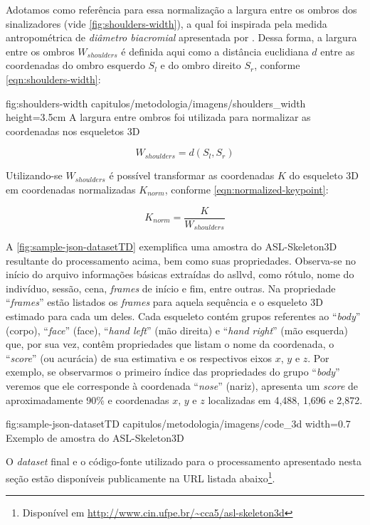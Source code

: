 \begin{enumerate}
          Adotamos como referência para essa normalização a largura entre os ombros dos sinalizadores (vide \autoref{fig:shoulders-width}), a qual foi inspirada pela medida antropométrica de \textit{diâmetro biacromial} apresentada por . Dessa forma, a largura entre os ombros \(W_{shoulders}\) é definida aqui como a distância euclidiana \(d\) entre as coordenadas do ombro esquerdo \(S_{l}\) e do ombro direito \(S_ {r}\), conforme \autoref{eqn:shoulders-width}:

          \figura
          {fig:shoulders-width} %
          {capitulos/metodologia/imagens/shoulders_width} %
          {height=3.5cm} %
          {A largura entre ombros foi utilizada para normalizar as coordenadas nos esqueletos 3D} %
          {} %

          \begin{equation}
              \label{eqn:shoulders-width}
              W_{shoulders} = d\left(S_{l}, S_{r}\right)
          \end{equation}

          Utilizando-se \(W_{shoulders}\) é possível transformar as coordenadas \(K\) do esqueleto 3D em coordenadas normalizadas \(K_{norm}\), conforme \autoref{eqn:normalized-keypoint}:

          \begin{equation}
              \label{eqn:normalized-keypoint}
              K_{norm} = \frac{K}{W_{shoulders}}
          \end{equation}

\end{enumerate}


A \autoref{fig:sample-json-datasetTD} exemplifica uma amostra do ASL-Skeleton3D resultante do processamento acima, bem como suas propriedades. Observa-se no início do arquivo informações básicas extraídas do \acrshort{asllvd}, como rótulo, nome do indivíduo, sessão, cena, \textit{frames} de início e fim, entre outras. Na propriedade ``\textit{frames}'' estão listados os \textit{frames} para aquela sequência e o esqueleto 3D estimado para cada um deles. Cada esqueleto contém grupos referentes ao ``\textit{body}'' (corpo), ``\textit{face}'' (face), ``\textit{hand left}'' (mão direita) e ``\textit{hand right}'' (mão esquerda) que, por sua vez, contêm propriedades que listam o nome da coordenada, o ``\textit{score}'' (ou acurácia) de sua estimativa e os respectivos eixos \(x\), \(y\) e \(z\).
Por exemplo, se observarmos o primeiro índice das propriedades do grupo ``\textit{body}'' veremos que ele corresponde à coordenada ``\textit{nose}'' (nariz), apresenta um \textit{score} de aproximadamente 90\% e coordenadas \(x\), \(y\) e \(z\) localizadas em 4,488, 1,696 e 2,872.

\figura
{fig:sample-json-datasetTD} %
{capitulos/metodologia/imagens/code_3d} %
{width=0.7\linewidth} %
{Exemplo de amostra do ASL-Skeleton3D} %
{} %

O \textit{dataset} final e o código-fonte utilizado para o processamento apresentado nesta seção estão disponíveis publicamente na URL listada abaixo\footnote{Disponível em \url{http://www.cin.ufpe.br/~cca5/asl-skeleton3d}}.
